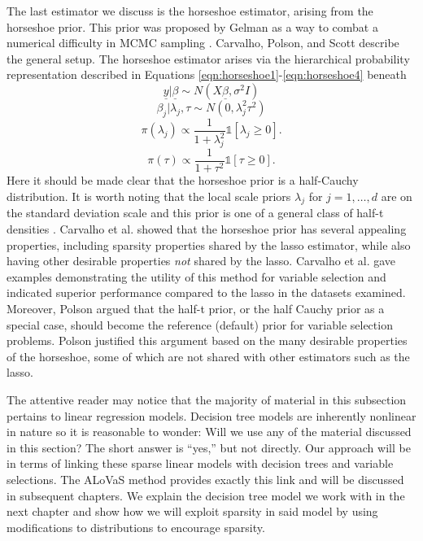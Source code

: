  The last estimator we discuss is the horseshoe estimator, arising from the horseshoe prior. This prior was proposed by Gelman as a way to combat a numerical difficulty in MCMC sampling \cite{gelman2006prior}. Carvalho, Polson, and Scott \cite{carvalho2010horseshoe,carvalhohandling} describe the general setup. The horseshoe estimator arises via the hierarchical probability representation described in Equations \ref{eqn:horseshoe1}-\ref{eqn:horseshoe4} beneath 
 \begin{equation}\label{eqn:horseshoe1}
 \underline{y}\vert\underline{\beta} \sim N(X\underline{\beta}, \sigma^2I)
 \end{equation}  
 \begin{equation}\label{eqn:horseshoe2}
 \beta_j\vert\lambda_j,\tau \sim N(0, \lambda_j^2\tau^2)
 \end{equation}  
  \begin{equation}\label{eqn:horseshoe3}
  \pi(\lambda_j)\propto \frac{1}{1+\lambda_j^2}\mathds{1}[\lambda_j\geq0].
 \end{equation} 
   \begin{equation}\label{eqn:horseshoe4}
  \pi(\tau)\propto \frac{1}{1+\tau^2}\mathds{1}[\tau\geq0].
 \end{equation}     
Here it should be made clear that the horseshoe prior is a half-Cauchy distribution. It is worth noting that the local scale priors $\lambda_j$ for $j=1, \dots, d$ are on the standard deviation scale and this prior is one of a general class of half-t densities \cite{gelman2006prior,polson2011half}. Carvalho et al. \cite{carvalhohandling} showed that the horseshoe prior has several appealing properties, including sparsity properties shared by the lasso estimator, while also having other desirable properties \emph{not} shared by the lasso. Carvalho et al. \cite{carvalho2010horseshoe,carvalhohandling} gave examples demonstrating the utility of this method for variable selection and indicated superior performance compared to the lasso in the datasets examined. Moreover, Polson \cite{polson2011half} argued that the half-t prior, or the half Cauchy prior as a special case, should become the reference (default) prior for variable selection problems. Polson justified this argument based on the many desirable properties of the horseshoe, some of which are not shared with other estimators such as the lasso. 
 
  The attentive reader may notice that the majority of material in this subsection pertains to linear regression models. Decision tree models are inherently nonlinear in nature so it is reasonable to wonder: Will we use any of the material discussed in this section? The short answer is ``yes,'' but not directly. Our approach will be in terms of linking these sparse linear models with decision trees and variable selections. The ALoVaS method provides exactly this link and will be discussed in subsequent chapters. We explain the decision tree model we work with in the next chapter and show how we will exploit sparsity in said model by using modifications to distributions to encourage sparsity. 
  
